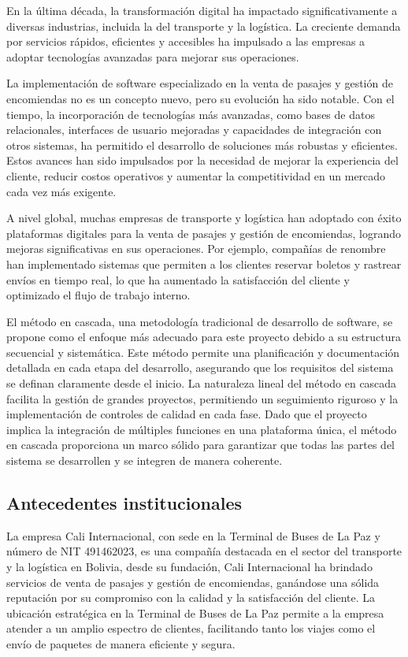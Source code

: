 \documentclass[12pt,letterpaper]{article}
\begin{document}
En la última década, la transformación digital ha impactado significativamente a diversas industrias, incluida la del transporte y la logística. La creciente demanda por servicios rápidos, eficientes y accesibles ha impulsado a las empresas a adoptar tecnologías avanzadas para mejorar sus operaciones.

La implementación de software especializado en la venta de pasajes y gestión de encomiendas no es un concepto nuevo, pero su evolución ha sido notable. Con el tiempo, la incorporación de tecnologías más avanzadas, como bases de datos relacionales, interfaces de usuario mejoradas y capacidades de integración con otros sistemas, ha permitido el desarrollo de soluciones más robustas y eficientes. Estos avances han sido impulsados por la necesidad de mejorar la experiencia del cliente, reducir costos operativos y aumentar la competitividad en un mercado cada vez más exigente.

A nivel global, muchas empresas de transporte y logística han adoptado con éxito plataformas digitales para la venta de pasajes y gestión de encomiendas, logrando mejoras significativas en sus operaciones. Por ejemplo, compañías de renombre han implementado sistemas que permiten a los clientes reservar boletos y rastrear envíos en tiempo real, lo que ha aumentado la satisfacción del cliente y optimizado el flujo de trabajo interno.

El método en cascada, una metodología tradicional de desarrollo de software, se propone como el enfoque más adecuado para este proyecto debido a su estructura secuencial y sistemática. Este método permite una planificación y documentación detallada en cada etapa del desarrollo, asegurando que los requisitos del sistema se definan claramente desde el inicio. La naturaleza lineal del método en cascada facilita la gestión de grandes proyectos, permitiendo un seguimiento riguroso y la implementación de controles de calidad en cada fase. Dado que el proyecto implica la integración de múltiples funciones en una plataforma única, el método en cascada proporciona un marco sólido para garantizar que todas las partes del sistema se desarrollen y se integren de manera coherente.

\subsection{Antecedentes institucionales}

La empresa Cali Internacional, con sede en la Terminal de Buses de La Paz y número de NIT 491462023, es una compañía destacada en el sector del transporte y la logística en Bolivia, desde su fundación, Cali Internacional ha brindado servicios de venta de pasajes y gestión de encomiendas, ganándose una sólida reputación por su compromiso con la calidad y la satisfacción del cliente. La ubicación estratégica en la Terminal de Buses de La Paz permite a la empresa atender a un amplio espectro de clientes, facilitando tanto los viajes como el envío de paquetes de manera eficiente y segura.
\end{document}
